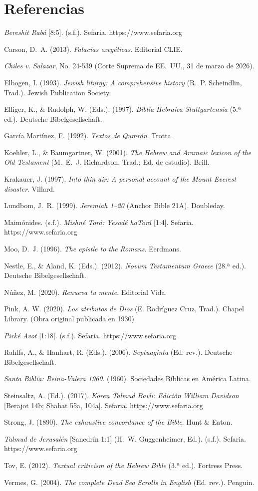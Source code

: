 \documentclass[11pt,letterpaper]{article}
\newcommand{\refapa}[1]{\par{\RaggedRight\hangindent=1.27cm\hangafter=1\noindent #1\par}\vspace{4pt}}
\begin{document}
\section*{Referencias}
\refapa{\emph{Bereshit Rabá} [8:5]. (s.f.). Sefaria. https://www.sefaria.org}
\refapa{Carson, D.~A. (2013). \emph{Falacias exegéticas}. Editorial CLIE.}
\refapa{\emph{Chiles v. Salazar}, No. 24-539 (Corte Suprema de EE.~UU., 31 de marzo de 2026).}
\refapa{Elbogen, I. (1993). \emph{Jewish liturgy: A comprehensive history} (R.~P. Scheindlin, Trad.). Jewish Publication Society.}
\refapa{Elliger, K., \& Rudolph, W. (Eds.). (1997). \emph{Biblia Hebraica Stuttgartensia} (5.ª ed.). Deutsche Bibelgesellschaft.}
\refapa{García Martínez, F. (1992). \emph{Textos de Qumrán}. Trotta.}
\refapa{Koehler, L., \& Baumgartner, W. (2001). \emph{The Hebrew and Aramaic lexicon of the Old Testament} (M.~E.~J. Richardson, Trad.; Ed. de estudio). Brill.}
\refapa{Krakauer, J. (1997). \emph{Into thin air: A personal account of the Mount Everest disaster}. Villard.}
\refapa{Lundbom, J.~R. (1999). \emph{Jeremiah 1--20} (Anchor Bible 21A). Doubleday.}
\refapa{Maimónides. (s.f.). \emph{Mishné Torá: Yesodé haTorá} [1:4]. Sefaria. https://www.sefaria.org}
\refapa{Moo, D.~J. (1996). \emph{The epistle to the Romans}. Eerdmans.}
\refapa{Nestle, E., \& Aland, K. (Eds.). (2012). \emph{Novum Testamentum Graece} (28.ª ed.). Deutsche Bibelgesellschaft.}
\refapa{Núñez, M. (2020). \emph{Renueva tu mente}. Editorial Vida.}
\refapa{Pink, A. W. (2020). \emph{Los atributos de Dios} (E. Rodríguez Cruz, Trad.). Chapel Library. (Obra original publicada en 1930)}
\refapa{\emph{Pirké Avot} [1:18]. (s.f.). Sefaria. https://www.sefaria.org}
\refapa{Rahlfs, A., \& Hanhart, R. (Eds.). (2006). \emph{Septuaginta} (Ed. rev.). Deutsche Bibelgesellschaft.}
\refapa{\emph{Santa Biblia: Reina-Valera 1960}. (1960). Sociedades Bíblicas en América Latina.}
\refapa{Steinsaltz, A. (Ed.). (2017). \emph{Koren Talmud Bavli: Edición William Davidson} [Berajot 14b; Shabat 55a, 104a]. Sefaria. https://www.sefaria.org}
\refapa{Strong, J. (1890). \emph{The exhaustive concordance of the Bible}. Hunt \& Eaton.}
\refapa{\emph{Talmud de Jerusalén} [Sanedrín 1:1] (H.~W. Guggenheimer, Ed.). (s.f.). Sefaria. https://www.sefaria.org}
\refapa{Tov, E. (2012). \emph{Textual criticism of the Hebrew Bible} (3.ª ed.). Fortress Press.}
\refapa{Vermes, G. (2004). \emph{The complete Dead Sea Scrolls in English} (Ed. rev.). Penguin.}
\end{document}
